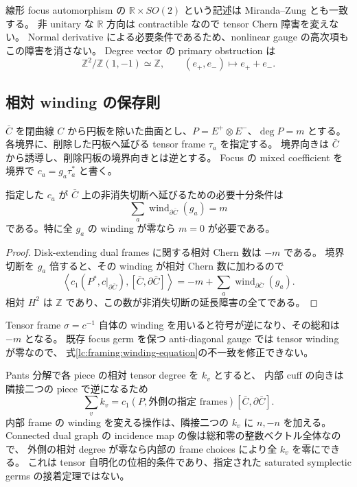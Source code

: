 線形 focus automorphism の $\mathbb R\times SO(2)$ という記述は
Miranda--Zung \cite[\S2.3]{miranda-local} とも一致する。
非 unitary な $\mathbb R$ 方向は contractible なので tensor Chern 障害を変えない。
Normal derivative による必要条件であるため、nonlinear gauge の高次項もこの障害を消さない。
Degree vector の primary obstruction は
\[
 \mathbb Z^2/\mathbb Z(1,-1)\simeq\mathbb Z,
 \qquad (e_+,e_-)\longmapsto e_++e_-.
\]

\subsection{相対 winding の保存則}

$\bar C$ を閉曲線 $C$ から円板を除いた曲面とし、$P=E^+\otimes E^-$、$\deg P=m$ とする。
各境界に、削除した円板へ延びる tensor frame $\tau_a$ を指定する。
境界向きは $\bar C$ から誘導し、削除円板の境界向きとは逆とする。
Focus の mixed coefficient を境界で $c_a=g_a\tau_a^*$ と書く。

\begin{proposition}\label{lc:framing:winding}
指定した $c_a$ が $\bar C$ 上の非消失切断へ延びるための必要十分条件は
\begin{equation}\label{lc:framing:winding-equation}
 \sum_a\operatorname{wind}_{\partial\bar C}(g_a)=m
\end{equation}
である。特に全 $g_a$ の winding が零なら $m=0$ が必要である。
\end{proposition}

\begin{proof}
Disk-extending dual frames に関する相対 Chern 数は $-m$ である。
境界切断を $g_a$ 倍すると、その winding が相対 Chern 数に加わるので
\[
 \left\langle c_1(P^*,c|_{\partial\bar C}),[\bar C,\partial\bar C]\right\rangle
 =-m+\sum_a\operatorname{wind}_{\partial\bar C}(g_a).
\]
相対 $H^2$ は $\mathbb Z$ であり、この数が非消失切断の延長障害の全てである。
\end{proof}

Tensor frame $\sigma=c^{-1}$ 自体の winding を用いると符号が逆になり、その総和は $-m$ となる。
既存 focus germ を保つ anti-diagonal gauge では tensor winding が零なので、
式\eqref{lc:framing:winding-equation}の不一致を修正できない。

Pants 分解で各 piece の相対 tensor degree を $k_v$ とすると、
内部 cuff の向きは隣接二つの piece で逆になるため
\[
 \sum_v k_v=c_1(P,\text{外側の指定 frames})[\bar C,\partial\bar C].
\]
内部 frame の winding を変える操作は、隣接二つの $k_v$ に $n,-n$ を加える。
Connected dual graph の incidence map の像は総和零の整数ベクトル全体なので、
外側の相対 degree が零なら内部の frame choices により全 $k_v$ を零にできる。
これは tensor 自明化の位相的条件であり、指定された saturated symplectic germs の接着定理ではない。


